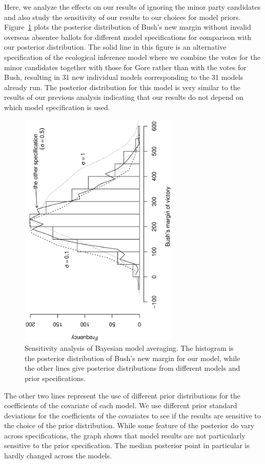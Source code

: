 \documentclass[11pt,titlepage]{article}
\begin{document}
Here, we analyze the effects on our results of ignoring the minor
party candidates and also study the sensitivity of our results to our
choices for model priors.  Figure~\ref{fg:sensitivity} plots the
posterior distribution of Bush's new margin without invalid overseas
absentee ballots for different model specifications for comparison
with our posterior distribution.  The solid line in this figure is an
alternative specification of the ecological inference model where we
combine the votes for the minor candidates together with those for
Gore rather than with the votes for Bush, resulting in 31 new
individual models corresponding to the 31 models already run.  The
posterior distribution for this model is very similar to the results
of our previous analysis indicating that our results do not depend on
which model specification is used.
\begin{figure}[t]
\begin{center}
\includegraphics[width=3in,height=4.5in,angle=-90]{sensitivity}
\caption{Sensitivity analysis of Bayesian model
  averaging. The histogram is the posterior distribution of Bush's new
  margin for our model, while the other lines give posterior
  distributions from different models and prior specifications.}
\label{fg:sensitivity}
\end{center} 
\end{figure}

The other two lines represent the use of different prior distributions
for the coefficients of the covariate of each model.  We use different
prior standard deviations for the coefficients of the covariates to
see if the results are sensitive to the choice of the prior
distribution.  While some feature of the posterior do vary across
specifications, the graph shows that model results are not
particularly sensitive to the prior specification.  The median
posterior point in particular is hardly changed across the models.

\singlespacing
\clearpage

%

\end{document}
